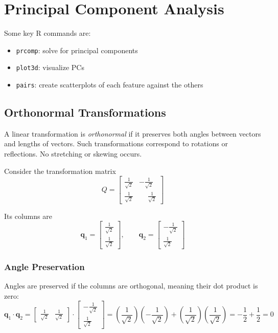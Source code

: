 \section{Principal Component Analysis}

\medskip

Some key R commands are:
\begin{itemize}
    \item \texttt{prcomp}: solve for principal components
    \item \texttt{plot3d}: visualize PCs
    \item \texttt{pairs}: create scatterplots of each feature against the others
\end{itemize}

\medskip

\bigskip

\subsection{Orthonormal Transformations}

A linear transformation is \textit{orthonormal} if it preserves both angles between vectors and lengths of vectors. Such transformations correspond to rotations or reflections. No stretching or skewing occurs.

\medskip

Consider the transformation matrix
\[
Q =
\begin{bmatrix}
\frac{1}{\sqrt{2}} & -\frac{1}{\sqrt{2}} \\
\frac{1}{\sqrt{2}} & \phantom{-}\frac{1}{\sqrt{2}}
\end{bmatrix}
\]

Its columns are
\[
\mathbf{q}_1 =
\begin{bmatrix}
\frac{1}{\sqrt{2}} \\
\frac{1}{\sqrt{2}}
\end{bmatrix},
\qquad
\mathbf{q}_2 =
\begin{bmatrix}
-\frac{1}{\sqrt{2}} \\
\frac{1}{\sqrt{2}}
\end{bmatrix}
\]

\subsubsection*{Angle Preservation}

Angles are preserved if the columns are orthogonal, meaning their dot product is zero:
\[
\mathbf{q}_1 \cdot \mathbf{q}_2
=
\begin{bmatrix}
\frac{1}{\sqrt{2}} &
\frac{1}{\sqrt{2}}
\end{bmatrix} \cdot 
\begin{bmatrix}
-\frac{1}{\sqrt{2}} \\
\frac{1}{\sqrt{2}}
\end{bmatrix}
=
\left(\frac{1}{\sqrt{2}}\right)\left(-\frac{1}{\sqrt{2}}\right)
+
\left(\frac{1}{\sqrt{2}}\right)\left(\frac{1}{\sqrt{2}}\right)
=
-\frac{1}{2} + \frac{1}{2} = 0
\]

